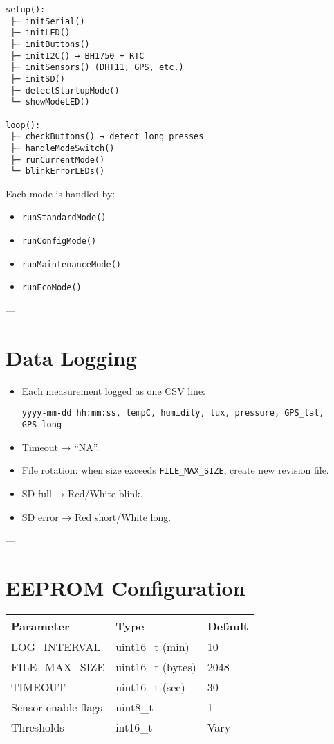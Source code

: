 \documentclass[a4paper,12pt]{article}
\begin{document}
\begin{verbatim}
setup():
 ├─ initSerial()
 ├─ initLED()
 ├─ initButtons()
 ├─ initI2C() → BH1750 + RTC
 ├─ initSensors() (DHT11, GPS, etc.)
 ├─ initSD()
 ├─ detectStartupMode()
 └─ showModeLED()

loop():
 ├─ checkButtons() → detect long presses
 ├─ handleModeSwitch()
 ├─ runCurrentMode()
 └─ blinkErrorLEDs()
\end{verbatim}

Each mode is handled by:
\begin{itemize}
  \item \texttt{runStandardMode()}
  \item \texttt{runConfigMode()}
  \item \texttt{runMaintenanceMode()}
  \item \texttt{runEcoMode()}
\end{itemize}

---

\section{Data Logging}

\begin{itemize}
  \item Each measurement logged as one CSV line:
\begin{lstlisting}
yyyy-mm-dd hh:mm:ss, tempC, humidity, lux, pressure, GPS_lat, GPS_long
\end{lstlisting}
  \item Timeout → ``NA''.
  \item File rotation: when size exceeds \texttt{FILE\_MAX\_SIZE}, create new revision file.
  \item SD full → Red/White blink.
  \item SD error → Red short/White long.
\end{itemize}

---

\section{EEPROM Configuration}

\begin{longtable}{|l|l|l|}
\hline
\textbf{Parameter} & \textbf{Type} & \textbf{Default} \\ \hline
LOG\_INTERVAL & uint16\_t (min) & 10 \\ \hline
FILE\_MAX\_SIZE & uint16\_t (bytes) & 2048 \\ \hline
TIMEOUT & uint16\_t (sec) & 30 \\ \hline
Sensor enable flags & uint8\_t & 1 \\ \hline
Thresholds & int16\_t & Vary \\ \hline
\end{longtable}
\end{document}
